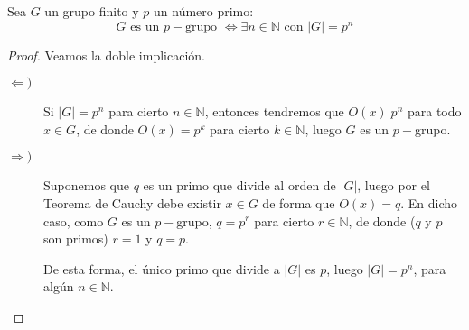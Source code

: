 \begin{coro}
    Sea $G$ un grupo finito y $p$ un número primo:
    \begin{equation*}
        G \text{\ es un $p-$grupo\ } \Longleftrightarrow \exists n\in \mathbb{N} \text{\ con\ } |G| = p^n
    \end{equation*}
    \begin{proof}
        Veamos la doble implicación.
        \begin{description}
            \item [$\Longleftarrow)$] Si $|G| = p^n$ para cierto $n\in \mathbb{N}$, entonces tendremos que $O(x) | p^n$ para todo $x\in G$, de donde $O(x) = p^k$ para cierto $k\in \mathbb{N}$, luego $G$ es un $p-$grupo.
            \item [$\Longrightarrow)$] Suponemos que $q$ es un primo que divide al orden de $|G|$, luego por el Teorema de Cauchy debe existir $x\in G$ de forma que $O(x) = q$. En dicho caso, como $G$ es un $p-$grupo, $q = p^r$ para cierto $r\in \mathbb{N}$, de donde ($q$ y $p$ son primos) $r = 1$ y $q = p$.

                De esta forma, el único primo que divide a $|G|$ es $p$, luego $|G| = p^n$, para algún $n\in \mathbb{N}$. \qedhere
        \end{description}
    \end{proof}
\end{coro}

